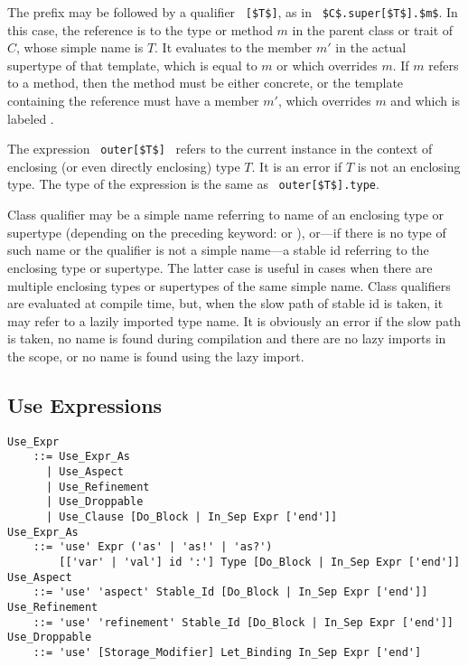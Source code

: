 The  prefix may be followed by a qualifier ~\lstinline![$T$]!, as in ~\lstinline!$C$.super[$T$].$m$!. In this case, the reference is to the type or method $m$ in the parent class or trait of $C$, whose simple name is $T$. It evaluates to the member $m'$ in the actual supertype of that template, which is equal to $m$ or which overrides $m$. If $m$ refers to a method, then the method must be either concrete, or the template containing the reference must have a member $m'$, which overrides $m$ and which is labeled . 

The expression ~\lstinline!outer[$T$]!~ refers to the current instance in the context of enclosing (or even directly enclosing) type $T$. It is an error if $T$ is not an enclosing type. The type of the expression is the same as ~\lstinline!outer[$T$].type!. 

Class qualifier may be a simple name referring to name of an enclosing type or supertype (depending on the preceding keyword:  or ), or---if there is no type of such name or the qualifier is not a simple name---a stable id referring to the enclosing type or supertype. The latter case is useful in cases when there are multiple enclosing types or supertypes of the same simple name. Class qualifiers are evaluated at compile time, but, when the slow path of stable id is taken, it may refer to a lazily imported type name. It is obviously an error if the slow path is taken, no name is found during compilation and there are no lazy imports in the scope, or no name is found using the lazy import. 





\subsection{Use Expressions}
\label{sec:use-expressions}

\grammar\begin{lstlisting}
Use_Expr 
    ::= Use_Expr_As 
      | Use_Aspect
      | Use_Refinement
      | Use_Droppable
      | Use_Clause [Do_Block | In_Sep Expr ['end']]
Use_Expr_As 
    ::= 'use' Expr ('as' | 'as!' | 'as?')
        [['var' | 'val'] id ':'] Type [Do_Block | In_Sep Expr ['end']]
Use_Aspect
    ::= 'use' 'aspect' Stable_Id [Do_Block | In_Sep Expr ['end']]
Use_Refinement 
    ::= 'use' 'refinement' Stable_Id [Do_Block | In_Sep Expr ['end']]
Use_Droppable 
    ::= 'use' [Storage_Modifier] Let_Binding In_Sep Expr ['end']
\end{lstlisting}

